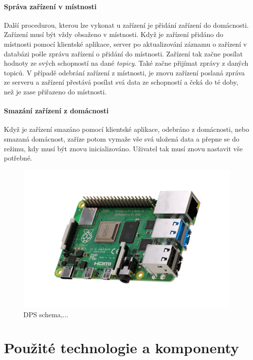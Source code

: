 \subsubsection*{Správa zařízení v místnosti}
Další procedurou, kterou lze vykonat u zařízení je přidání zařízení do domácnosti. Zařízení musí být vždy obsaženo v místnosti.
Když je zařízení přidáno do místnosti pomocí klientské aplikace, server po aktualizování záznamu o zařízení v databázi pošle zprávu zařízení o přidání do místnosti.
Zařízení tak začne posílat hodnoty ze svých schopností na dané \emph{topicy}. Také začne přijímat zprávy z daných topiců.
V případě odebrání zařízení z místnosti, je znovu zařízení poslaná zpráva ze serveru a zařízení přestává posílat svá data ze schopností a čeká do té doby, než je zase přiřazeno do místnosti.
\newline

\subsubsection*{Smazání zařízení z domácnosti}
Když je zařízení smazáno pomocí klientské aplikace, odebráno z domácnosti, nebo smazaná domácnost, zaříze potom vymaže vše svá uložená data a přepne se do režimu, kdy musí být znovu inicializováno.
Uživatel tak musí znovu nastavit vše potřebné.

\begin{figure}[hbt]
  \centering
  \includegraphics[width=0.9 \linewidth]{obrazky-figures/raspberry.png}
  \caption{DPS schema,...}
  \label{figure:schema}
\end{figure}

\newpage
\chapter{Použité technologie a komponenty}
\label{pouzite}

